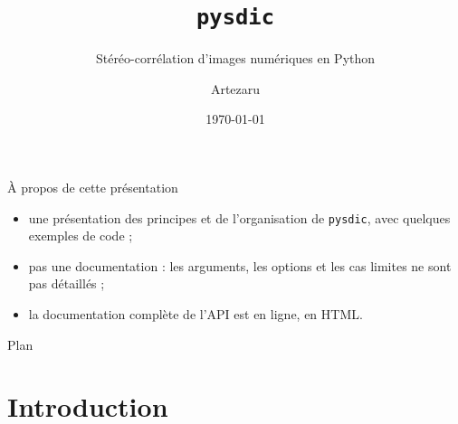 \documentclass[aspectratio=169,11pt]{beamer}
\title{\texttt{pysdic}}
\subtitle{Stéréo-corrélation d'images numériques en Python}
\author{Artezaru}
\date{\today}
\begin{document}
 
\maketitle
 
\begin{frame}{À propos de cette présentation}
  \begin{itemize}
    \item une présentation des \alert{principes} et de l'\alert{organisation} de
          \texttt{pysdic}, avec quelques exemples de code ;
    \item \alert{pas une documentation} : les arguments, les options et les cas
          limites ne sont pas détaillés ;
    \item la documentation complète de l'API est en ligne, en HTML.
  \end{itemize}
\end{frame}
 
\begin{frame}{Plan}
  \tableofcontents
\end{frame}
 
\section{Introduction}
 
\end{document}
